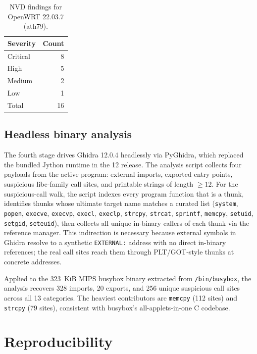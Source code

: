 \documentclass[conference]{IEEEtran}
\begin{document}
\begin{table}[t]
\caption{NVD findings for OpenWRT 22.03.7 (ath79).}
\label{tab:findings}
\centering
\begin{tabular}{lr}
\toprule
Severity & Count \\
\midrule
Critical & 8 \\
High     & 5 \\
Medium   & 2 \\
Low      & 1 \\
\midrule
Total    & 16 \\
\bottomrule
\end{tabular}
\end{table}

\subsection{Headless binary analysis}

The fourth stage drives Ghidra 12.0.4 headlessly via PyGhidra,
which replaced the bundled Jython runtime in the 12 release. The
analysis script collects four payloads from the active program:
external imports, exported entry points, suspicious libc-family
call sites, and printable strings of length $\geq 12$. For the
suspicious-call walk, the script indexes every program function
that is a thunk, identifies thunks whose ultimate target name
matches a curated list (\texttt{system}, \texttt{popen},
\texttt{execve}, \texttt{execvp}, \texttt{execl}, \texttt{execlp},
\texttt{strcpy}, \texttt{strcat}, \texttt{sprintf},
\texttt{memcpy}, \texttt{setuid}, \texttt{setgid},
\texttt{seteuid}), then collects all unique in-binary callers of
each thunk via the reference manager. This indirection is
necessary because external symbols in Ghidra resolve to a
synthetic \texttt{EXTERNAL:} address with no direct in-binary
references; the real call sites reach them through PLT/GOT-style
thunks at concrete addresses.

Applied to the 323~KiB MIPS busybox binary extracted from
\texttt{/bin/busybox}, the analysis recovers 328 imports, 20
exports, and 256 unique suspicious call sites across all 13
categories. The heaviest contributors are \texttt{memcpy} (112
sites) and \texttt{strcpy} (79 sites), consistent with busybox's
all-applets-in-one C codebase.

\section{Reproducibility}
\end{document}
